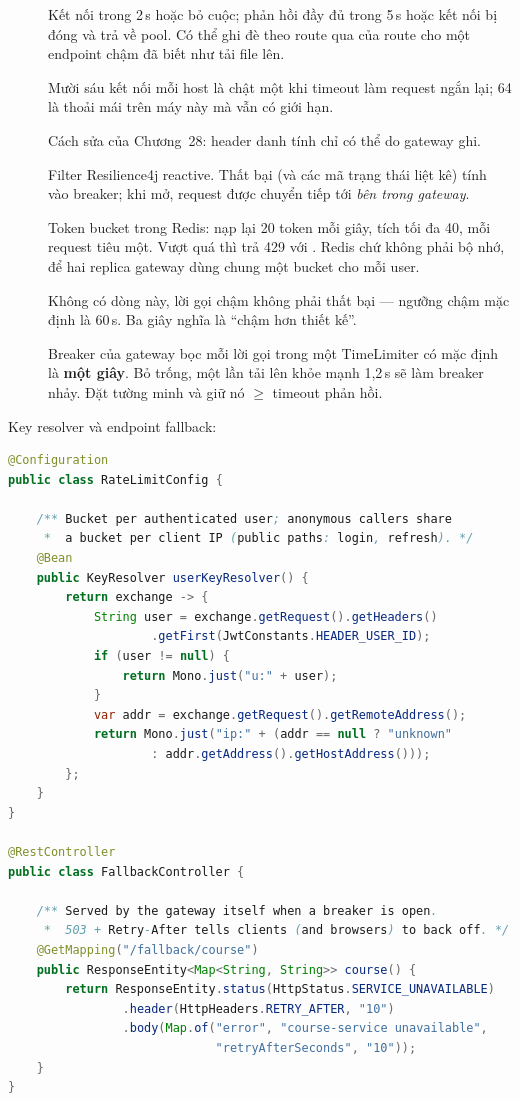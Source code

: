 \begin{description}
  \item[] Kết nối trong 2\,s hoặc bỏ cuộc; phản hồi đầy đủ trong
  5\,s hoặc kết nối bị đóng và trả về pool. Có thể ghi đè theo route
  qua  của route cho một endpoint chậm đã biết như tải
  file lên.
  \item[] Mười sáu kết nối mỗi host là chật một khi timeout làm
  request ngắn lại; 64 là thoải mái trên máy này mà vẫn có giới hạn.
  \item[] Cách sửa của Chương~28: header danh tính chỉ có thể do
  gateway ghi.
  \item[] Filter Resilience4j reactive. Thất bại (và các mã trạng
  thái liệt kê) tính vào breaker; khi mở, request được chuyển tiếp tới
   \emph{bên trong gateway}.
  \item[] Token bucket trong Redis: nạp lại 20 token mỗi giây,
  tích tối đa 40, mỗi request tiêu một. Vượt quá thì trả 429 với
  . Redis chứ không phải bộ nhớ, để hai
  replica gateway dùng chung một bucket cho mỗi user.
  \item[] Không có dòng này, lời gọi chậm không phải thất bại ---
  ngưỡng chậm mặc định là 60\,s. Ba giây nghĩa là ``chậm hơn thiết
  kế''.
  \item[] Breaker của gateway bọc mỗi lời gọi trong một
  TimeLimiter có mặc định là \textbf{một giây}. Bỏ trống, một lần tải
  lên khỏe mạnh 1,2\,s sẽ làm breaker nhảy. Đặt tường minh và giữ nó
  $\ge$ timeout phản hồi.
\end{description}

Key resolver và endpoint fallback:

\begin{lstlisting}[language=Java]
@Configuration
public class RateLimitConfig {

    /** Bucket per authenticated user; anonymous callers share
     *  a bucket per client IP (public paths: login, refresh). */
    @Bean
    public KeyResolver userKeyResolver() {
        return exchange -> {
            String user = exchange.getRequest().getHeaders()
                    .getFirst(JwtConstants.HEADER_USER_ID);
            if (user != null) {
                return Mono.just("u:" + user);
            }
            var addr = exchange.getRequest().getRemoteAddress();
            return Mono.just("ip:" + (addr == null ? "unknown"
                    : addr.getAddress().getHostAddress()));
        };
    }
}

@RestController
public class FallbackController {

    /** Served by the gateway itself when a breaker is open.
     *  503 + Retry-After tells clients (and browsers) to back off. */
    @GetMapping("/fallback/course")
    public ResponseEntity<Map<String, String>> course() {
        return ResponseEntity.status(HttpStatus.SERVICE_UNAVAILABLE)
                .header(HttpHeaders.RETRY_AFTER, "10")
                .body(Map.of("error", "course-service unavailable",
                             "retryAfterSeconds", "10"));
    }
}
\end{lstlisting}

